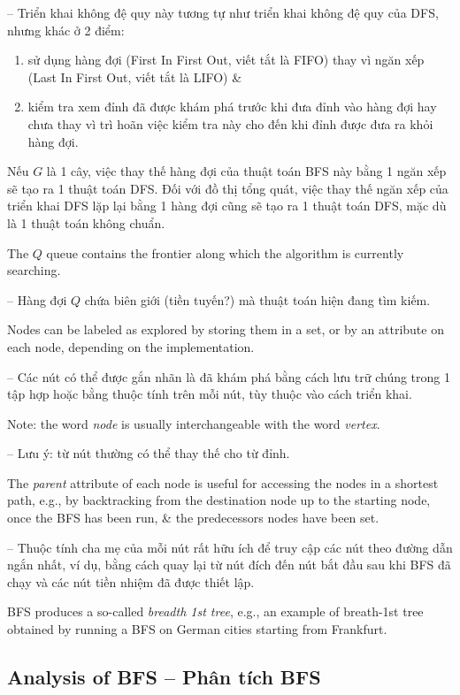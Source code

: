 \documentclass[oneside]{book}
\begin{document}
-- Triển khai không đệ quy này tương tự như triển khai không đệ quy của DFS, nhưng khác ở 2 điểm:
\begin{enumerate}
	\item sử dụng hàng đợi (First In First Out, viết tắt là FIFO) thay vì ngăn xếp (Last In First Out, viết tắt là LIFO) \&
	\item kiểm tra xem đỉnh đã được khám phá trước khi đưa đỉnh vào hàng đợi hay chưa thay vì trì hoãn việc kiểm tra này cho đến khi đỉnh được đưa ra khỏi hàng đợi.
\end{enumerate}
Nếu $G$ là 1 cây, việc thay thế hàng đợi của thuật toán BFS này bằng 1 ngăn xếp sẽ tạo ra 1 thuật toán DFS. Đối với đồ thị tổng quát, việc thay thế ngăn xếp của triển khai DFS lặp lại bằng 1 hàng đợi cũng sẽ tạo ra 1 thuật toán DFS, mặc dù là 1 thuật toán không chuẩn.

The $Q$ queue contains the frontier along which the algorithm is currently searching.

-- Hàng đợi $Q$ chứa biên giới (tiền tuyến?) mà thuật toán hiện đang tìm kiếm.

Nodes can be labeled as explored by storing them in a set, or by an attribute on each node, depending on the implementation.

-- Các nút có thể được gắn nhãn là đã khám phá bằng cách lưu trữ chúng trong 1 tập hợp hoặc bằng thuộc tính trên mỗi nút, tùy thuộc vào cách triển khai.

Note: the word {\it node} is usually interchangeable with the word {\it vertex}.

-- Lưu ý: từ nút thường có thể thay thế cho từ đỉnh.

The {\it parent} attribute of each node is useful for accessing the nodes in a shortest path, e.g., by backtracking from the destination node up to the starting node, once the BFS has been run, \& the predecessors nodes have been set.

-- Thuộc tính cha mẹ của mỗi nút rất hữu ích để truy cập các nút theo đường dẫn ngắn nhất, ví dụ, bằng cách quay lại từ nút đích đến nút bắt đầu sau khi BFS đã chạy và các nút tiền nhiệm đã được thiết lập.

BFS produces a so-called {\it breadth 1st tree}, e.g., an example of breath-1st tree obtained by running a BFS on German cities starting from Frankfurt.


\subsection{Analysis of BFS -- Phân tích BFS}
\end{document}
